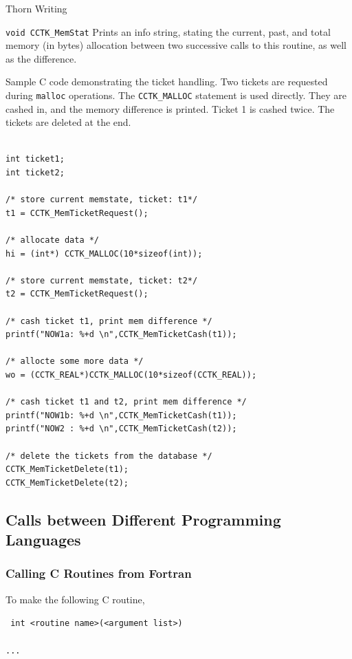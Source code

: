 \begin{cactuspart}{Thorn Writing}
\begin{Lentry}
\item[\texttt{void CCTK\_MemStat}] Prints an info string, stating the current,
        past, and total memory (in bytes) allocation between two
        successive calls to this routine, as well as the difference.
\end{Lentry}

Sample C code demonstrating the ticket handling. Two tickets are
requested during \texttt{malloc} operations. The \texttt{CCTK\_MALLOC} statement is
used directly. They are cashed in, and the memory
difference is printed. Ticket 1 is cashed twice. The tickets are
deleted at the end.
\begin{verbatim}

int ticket1;
int ticket2;

/* store current memstate, ticket: t1*/
t1 = CCTK_MemTicketRequest();

/* allocate data */
hi = (int*) CCTK_MALLOC(10*sizeof(int));

/* store current memstate, ticket: t2*/
t2 = CCTK_MemTicketRequest();

/* cash ticket t1, print mem difference */
printf("NOW1a: %+d \n",CCTK_MemTicketCash(t1));

/* allocte some more data */
wo = (CCTK_REAL*)CCTK_MALLOC(10*sizeof(CCTK_REAL));

/* cash ticket t1 and t2, print mem difference */
printf("NOW1b: %+d \n",CCTK_MemTicketCash(t1));
printf("NOW2 : %+d \n",CCTK_MemTicketCash(t2));

/* delete the tickets from the database */
CCTK_MemTicketDelete(t1);
CCTK_MemTicketDelete(t2);

\end{verbatim}


\subsection[Calls to different language]{Calls between Different Programming Languages}

\subsubsection{Calling C Routines from Fortran}
\label{sec:cacrofr}

To make the following C routine,

{\tt
int <routine name>(<argument list>)\\
{\\
...\\
}
}


\end{cactuspart}
